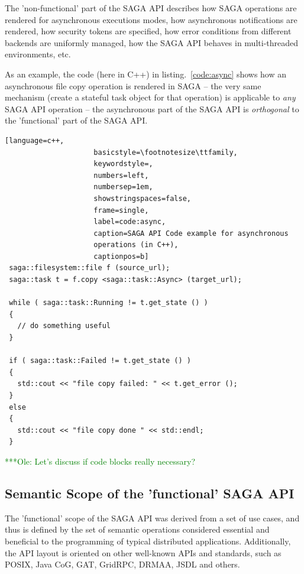 \documentclass[a4paper,12pt]{article}
\newcommand{\onote}[1]{    {\textcolor{green}{ ***Ole:      #1 }}}
\newcommand{\onote}[1]{}
\newcommand{\I}[1]{\textit{#1}}
\begin{document}
  The 'non-functional' part of the SAGA API describes how SAGA
  operations are rendered for asynchronous executions modes, how
  asynchronous notifications are rendered, how security tokens are
  specified, how error conditions from different backends are
  uniformly managed, how the SAGA API behaves in multi-threaded
  environments, etc.

  As an example, the code (here in C++) in listing.~\ref{code:async}
  shows how an asynchronous file copy operation is rendered in SAGA --
  the very same mechanism (create a stateful task object for that
  operation) is applicable to \I{any} SAGA API operation -- the
  asynchronous part of the SAGA API is \I{orthogonal} to the
  'functional' part of the SAGA API.\\

  \begin{lstlisting}[language=c++,
                     basicstyle=\footnotesize\ttfamily,
                     keywordstyle=,
                     numbers=left,
                     numbersep=1em,
                     showstringspaces=false,
                     frame=single, 
                     label=code:async,
                     caption=SAGA API Code example for asynchronous
                     operations (in C++),
                     captionpos=b]
 saga::filesystem::file f (source_url);
 saga::task t = f.copy <saga::task::Async> (target_url);

 while ( saga::task::Running != t.get_state () )
 {
   // do something useful
 }

 if ( saga::task::Failed != t.get_state () )
 {
   std::cout << "file copy failed: " << t.get_error ();
 } 
 else
 {
   std::cout << "file copy done " << std::endl;
 }
  \end{lstlisting}
\onote{Let's discuss if code blocks really necessary?}

 
 \subsection{Semantic Scope of the 'functional' SAGA API}

  The 'functional' scope of the SAGA API was derived from a set of use
  cases, and thus is defined by the set of semantic operations
  considered essential and beneficial to the programming of typical
  distributed applications.  Additionally, the API layout is oriented
  on other well-known APIs and standards, such as POSIX, Java CoG,
  GAT, GridRPC, DRMAA, JSDL and others.
\end{document}
